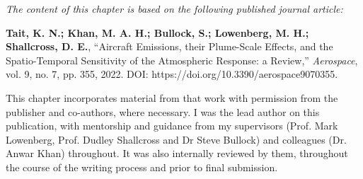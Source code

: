 \textit{The content of this chapter is based on the following published journal article:}

\textbf{Tait, K. N.; Khan, M. A. H.; Bullock, S.; Lowenberg, M. H.; Shallcross, D. E.}, ``Aircraft Emissions, their Plume-Scale Effects, and the Spatio-Temporal Sensitivity of the Atmospheric Response: a Review,'' \textit{Aerospace}, vol. 9, no. 7, pp. 355, 2022. DOI: https://doi.org/10.3390/aerospace9070355.

This chapter incorporates material from that work with permission from the publisher and co-authors, where necessary. I was the lead author on this publication, with mentorship and guidance from my supervisors (Prof. Mark Lowenberg, Prof. Dudley Shallcross and Dr Steve Bullock) and colleagues (Dr. Anwar Khan) throughout. It was also internally reviewed by them, throughout the course of the writing process and prior to final submission.
















